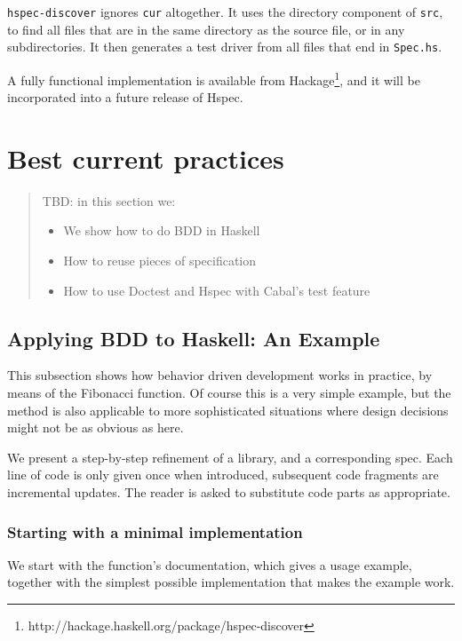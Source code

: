 \documentclass[preprint]{sigplanconf}
\begin{document}
\verb|hspec-discover| ignores {\tt cur} altogether.  It uses the
directory component of {\tt src}, to find all files that are in the
same directory as the source file, or in any subdirectories.  It then generates
a test driver from all files that end in {\tt Spec.hs}.

A fully functional implementation is available from
Hackage\footnote{http://hackage.haskell.org/package/hspec-discover},
and it will be incorporated into a future release of Hspec.

\section{Best current practices}
\label{sec:best-current-practice}

\begin{quote}
    TBD: in this section we:
    \begin{itemize}
        \item We show how to do BDD in Haskell
        \item How to reuse pieces of specification
        \item How to use Doctest and Hspec with Cabal's test feature
    \end{itemize}
\end{quote}

\subsection{Applying BDD to Haskell: An Example}
This subsection shows how behavior driven development works in practice,
by means of the Fibonacci function.  Of course this is a very simple
example, but the method is also applicable to more sophisticated
situations where design decisions might not be as obvious as here.

We present a step-by-step refinement of a library, and a corresponding
spec.  Each line of code is only given once when introduced,
subsequent code fragments are incremental updates.  The reader is
asked to substitute code parts as appropriate.

\subsubsection{Starting with a minimal implementation}

We start with the function's documentation, which gives a usage
example, together with the simplest possible implementation that makes
the example work.
\end{document}
